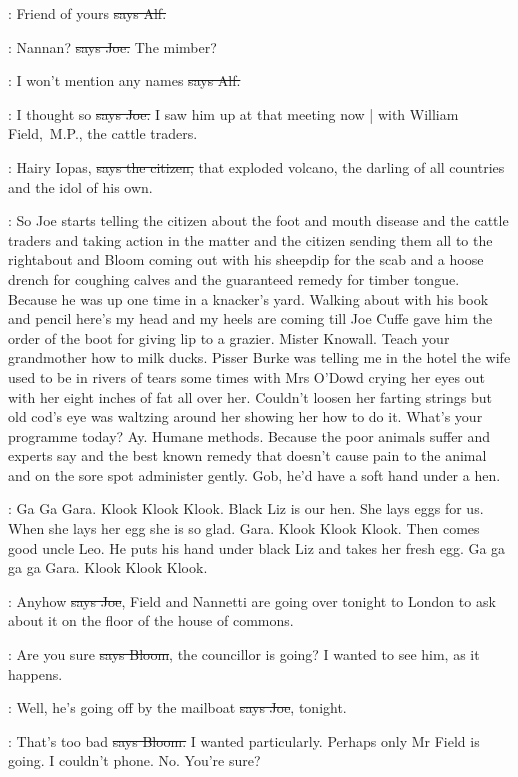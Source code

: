 \bergan:
Friend of yours
\sout{says Alf.}

\joe:
Nannan?
\sout{says Joe.} The mimber?

\bergan:
I won't mention any names
\sout{says Alf.}

\joe:
I thought so
\sout{says Joe.}
I saw him up at that meeting now |
with William Field,~M.P.,
the cattle traders.

\citizen:
Hairy Iopas,
\sout{says the citizen,}
that exploded volcano,
the darling of all
countries
and the idol of his own.

\Nq:
So Joe starts telling the citizen about the foot and mouth disease and
the cattle traders and taking action in the matter and the citizen sending
them all to the rightabout and Bloom coming out with his sheepdip for the
scab and a hoose drench for coughing calves and the guaranteed remedy
for timber tongue.
Because he was up one time in a knacker's yard.
Walking about with his book and pencil here's my head and my heels are
coming till Joe Cuffe gave him the order of the boot for giving lip to a
grazier.
Mister Knowall.
Teach your grandmother how to milk ducks.
Pisser Burke was telling me in the hotel the wife used to be in rivers of
tears some times with Mrs O'Dowd crying her eyes out
with her eight inches
of fat all over her.
Couldn't loosen her farting strings but old cod's eye
was waltzing around her showing her how to do it.
What's your programme
today?
Ay.
Humane methods.
Because the poor animals suffer and experts
say and the best known remedy that doesn't cause pain to the animal and
on the sore spot administer gently.
Gob,
he'd have a soft hand under a
hen.

:
Ga Ga Gara.
Klook Klook Klook.
Black Liz is our hen.
She lays eggs
for us.
When she lays her egg she is so glad.
Gara.
Klook Klook Klook.
Then comes good uncle Leo.
He puts his hand under black Liz and takes
her fresh egg.
Ga ga ga ga Gara.
Klook Klook Klook.

\joe:
Anyhow
\sout{says Joe},
Field and Nannetti are going over tonight to London
to ask about it on the floor of the house of commons.

\Bloom:
Are you sure
\sout{says Bloom},
the councillor is going?
I wanted to see him,
as it happens.

\joe:
Well,
he's going off by the mailboat
\sout{says Joe},
tonight.

\Bloom:
That's too bad
\sout{says Bloom.}
I wanted particularly.
Perhaps only Mr Field
is going.
I couldn't phone.
No.
You're sure?

